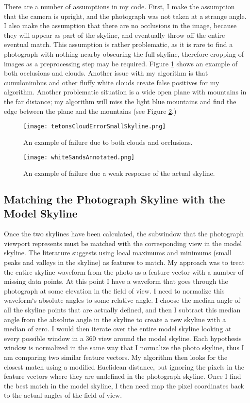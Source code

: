 \documentclass{acm_proc_article-sp}
\begin{document}
    There are a number of assumptions in my code.  First, I make the assumption that the camera is upright, and the photograph was not taken at a strange angle.  I also make the assumption that there are no occlusions in the image, because they will appear as part of the skyline, and eventually throw off the entire eventual match.  This assumption is rather problematic, as it is rare to find a photograph with nothing nearby obscuring the full skyline, therefore cropping of images as a preprocessing step may be required. Figure \ref{fig:tetFail} shows an example of both occlusions and clouds. Another issue with my algorithm is that cumulonimbus and other fluffy white clouds create false positives for my algorithm.   Another problematic situation is a wide open plane with mountains in the far distance; my algorithm will miss the light blue mountains and find the edge between the plane and the mountains (see Figure \ref{fig:whiteSandsFail}.)  
\begin{figure}
	\centering
	\texttt{[image: tetonsCloudErrorSmallSkyline.png]}
	\caption{An example of failure due to both clouds and occlusions.}
	\label{fig:tetFail}
\end{figure}
\begin{figure}
\centering
	\texttt{[image: whiteSandsAnnotated.png]}
	\caption{An example of failure due a weak response of the actual skyline.}
	\label{fig:whiteSandsFail}
\end{figure}

\subsection{Matching the Photograph Skyline with the Model Skyline}
    Once the two skylines have been calculated, the subwindow that the photograph viewport represents must be matched with the corresponding view in the model skyline.  The literature suggests using local maximums and minimums (small peaks and valleys in the skyline) as features to match. My approach was to treat the entire skyline  waveform from the photo as a feature vector with a number of missing data points. At this point I have a waveform that goes through the photograph at some elevation in the field of view.  I need to normalize this waveform`s absolute angles to some relative angle.  I choose the median angle of all the skyline points that are actually defined, and then I subtract this median angle from the absolute angle in the skyline to create a new skyline with a median of zero.  I would then iterate over the entire model skyline looking at every possible window in a 360 view around the model skyline.  Each hypothesis window is normalized in the same way that I normalize the photo skyline, thus I am comparing two similar feature vectors.  My algorithm then looks for the closest match using a modified Euclidean distance, but ignoring the pixels in the feature vectors where they are undefined in the photograph skyline.  Once I find the best match in the model skyline, I then need map the pixel coordinates back to the actual angles of the field of view.
\end{document}
